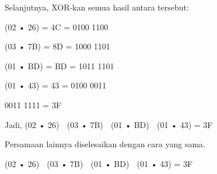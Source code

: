 \documentclass{article}
\begin{document}

Selanjutnya, XOR-kan semua hasil antara tersebut:


(02 • 26)   = 4C =  0100 1100


(03 • 7B)   = 8D = 1000 1101

       (01 • BD)  = BD = 1011 1101

       (01 • 43)   = 43 =  0100 0011 


                               0011 1111 = 3F

Jadi, (02 • 26)  (03 • 7B)  (01 • BD)  (01 • 43) = 3F

Persamaan lainnya diselesaikan dengan cara yang sama.

(02 • 26)  (03 • 7B)  (01 • BD)  (01 • 43) = 3F
\end{document}
